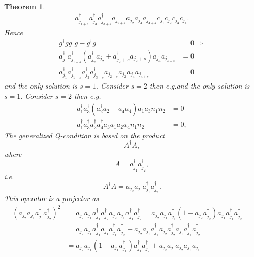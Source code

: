 \documentclass[aps,preprint]{revtex4}%
\newtheorem{theorem}{Theorem}
\begin{document}
\begin{theorem}
\begin{align}
{}a_{j_{1+s}}^{\dagger}a_{j_{3}}^{\dagger}a_{j_{3+s}}^{\dagger}a_{j_{2+s}%
}a_{j_{2}}a_{j_{4}}a_{j_{4+s}}c_{j_{1}}c_{j_{2}}c_{j_{3}}c_{j_{4}}.
\end{align}
Hence
\begin{align}
g^{\dagger}gg^{\dagger}g-g^{\dagger}g  &  =0\Rightarrow\nonumber\\
a_{j_{1}}^{\dagger}a_{j_{1+s}}^{\dagger}\left(  a_{j_{2}}^{\dagger}a_{j_{2}%
}+a_{j_{2}+s}^{\dagger}a_{j_{2}+s}\right)  a_{j_{4}}a_{j_{4+s}}  &
=0\nonumber\\
a_{j_{1}}^{\dagger}a_{j_{1+s}}^{\dagger}a_{j_{3}}^{\dagger}a_{j_{3+s}%
}^{\dagger}a_{j_{2+s}}a_{j_{2}}a_{j_{4}}a_{j_{4+s}}  &  =0
\end{align}
and the only solution is $s=1.$ Consider $s=2$ then e.g.and the only solution
is $s=1.$ Consider $s=2$ then e.g.%
\begin{align}
a_{1}^{\dagger}a_{3}^{\dagger}\left(  a_{2}^{\dagger}a_{2}+a_{4}^{\dagger
}a_{4}\right)  a_{1}a_{3}n_{1}n_{2}  &  =0\nonumber\\
a_{1}^{\dagger}a_{3}^{\dagger}a_{2}^{\dagger}a_{4}^{\dagger}a_{3}a_{1}%
a_{2}a_{4}n_{1}n_{2}  &  =0,
\end{align}
The generalized Q-condition is based on the product
\begin{equation}
A^{\dagger}A,
\end{equation}
where
\begin{equation}
A=a_{j_{1}}^{\dagger}a_{j_{2}}^{\dagger},
\end{equation}
i.e.%
\begin{equation}
A^{\dagger}A=a_{j_{2}}a_{j_{1}}a_{j_{1}}^{\dagger}a_{j_{2}}^{\dagger}.
\end{equation}
This operator is a projector as
\begin{align}
\left(  a_{j_{2}}a_{j_{1}}a_{j_{1}}^{\dagger}a_{j_{2}}^{\dagger}\right)  ^{2}
&  =a_{j_{2}}a_{j_{1}}a_{j_{1}}^{\dagger}a_{j_{2}}^{\dagger}a_{j_{2}}a_{j_{1}%
}a_{j_{1}}^{\dagger}a_{j_{2}}^{\dagger}=a_{j_{2}}a_{j_{1}}a_{j_{1}}^{\dagger
}\left(  1-a_{j_{2}}a_{j_{2}}^{\dagger}\right)  a_{j_{1}}a_{j_{1}}^{\dagger
}a_{j_{2}}^{\dagger}=\nonumber\\
&  =a_{j_{2}}a_{j_{1}}a_{j_{1}}^{\dagger}a_{j_{1}}a_{j_{1}}^{\dagger}a_{j_{2}%
}^{\dagger}-a_{j_{2}}a_{j_{1}}a_{j_{1}}^{\dagger}a_{j_{2}}a_{j_{2}}^{\dagger
}a_{j_{1}}a_{j_{1}}^{\dagger}a_{j_{2}}^{\dagger}\nonumber\\
&  =a_{j_{2}}a_{j_{1}}\left(  1-a_{j_{1}}a_{j_{1}}^{\dagger}\right)  a_{j_{1}%
}^{\dagger}a_{j_{2}}^{\dagger}+a_{j_{2}}a_{j_{1}}a_{j_{2}}a_{j_{1}}a_{j_{1}%
}
\end{align}
\end{theorem}
\end{document}
